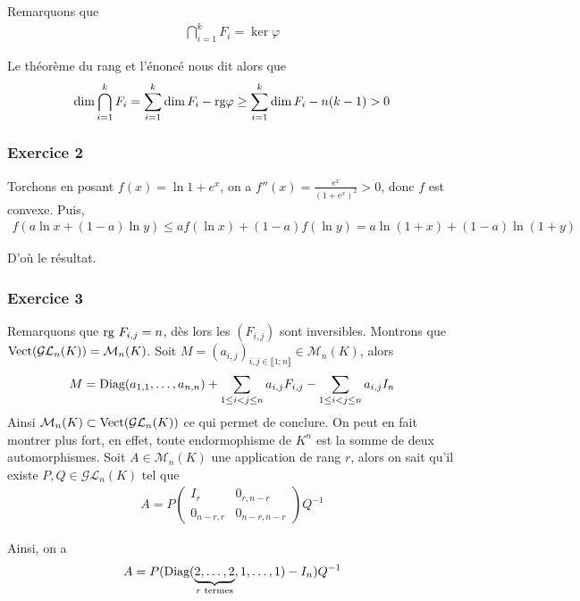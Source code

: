 \documentclass{article}
\begin{document}
Remarquons que
\begin{align*}
\bigcap_{i=1}^k F_i = \ker \varphi
\end{align*}

Le théorème du rang et l'énoncé nous dit alors que 
\begin{align*}
\dim \bigcap_{i=1}^k F_i = \sum_{i=1}^k \dim F_i -\textup{rg} \varphi \geq \sum_{i=1}^k \dim F_i - n(k-1)>0
\end{align*}


\subsubsection*{Exercice 2}
Torchons en posant $f(x) = \ln{1+e^x}$, on a $f''(x) = \frac{e^x}{(1+e^x)^2}>0$, donc $f$ est convexe. Puis,
\begin{align*}
f(a\ln x + (1-a)\ln y)\leq af(\ln{x})+(1-a)f(\ln y) = a\ln{(1+x)}+(1-a)\ln{(1+y)}
\end{align*}

D'où le résultat.
\subsubsection*{Exercice 3}
Remarquons que $\textup{rg } {F_{i,j}}=n$, dès lors les $(F_{i,j})$ sont inversibles. Montrons que $\textup{Vect}(\mathcal{G}\mathcal{L}_n(K))=\mathcal{M}_n(K)$. Soit $M=(a_{i,j})_{i,j\in\llbracket 1;n\rrbracket}\in\mathcal{M}_n(K)$, alors 
\begin{align*}
M = \textup{Diag}({a_{1,1},\ldots, a_{n,n}})+\sum_{1\leq i<j\leq n}{a_{i,j} F_{i,j}}-\sum_{1\leq i<j\leq n}{a_{i,j}}I_n
\end{align*}
Ainsi 
$\mathcal{M}_n(K)\subset \textup{Vect}(\mathcal{G}\mathcal{L}_n(K))$ ce qui permet de conclure.
On peut en fait montrer plus fort, en effet, toute endormophisme de $K^n$ est la somme de deux automorphismes. Soit $A\in\mathcal{M}_n(K)$ une application de rang $r$, alors on sait qu'il existe $P, Q\in\mathcal{G}\mathcal{L}_n(K)$ tel que 
\begin{align*}
A = P \begin{pmatrix}
I_{r} & 0_{r, n-r}\\
0_{n-r,r} & 0_{n-r,n-r}
\end{pmatrix}
Q^{-1}
\end{align*}

Ainsi, on a 
\begin{align*}
A = P (\textup{Diag}(\underbrace{2,\ldots,2}_{r \textup{ termes}},1,\ldots,1)-I_n)Q^{-1}
\end{align*}
\end{document}
